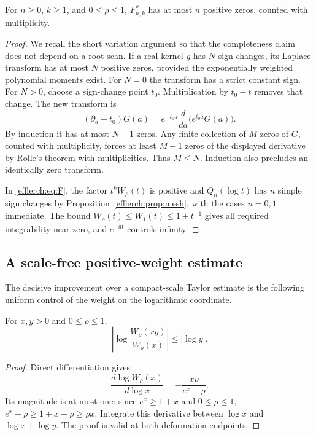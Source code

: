 \begin{lemma}
\label{efflerch:lem:variation}
For $n\geq0$, $k\geq1$, and $0\leq\rho\leq1$,
$F_{n,k}^\rho$ has at most $n$ positive zeros, counted with multiplicity.
\end{lemma}
\begin{proof}
We recall the short variation argument so that the completeness claim
does not depend on a root scan.  If a real kernel $g$ has
$N$ sign changes, its Laplace transform has at most $N$ positive zeros,
provided the exponentially weighted polynomial moments exist.
For $N=0$ the transform has a strict constant sign.  For $N>0$, choose
a sign-change point $t_0$.  Multiplication by $t_0-t$ removes that
change.  The new transform is
\[
 (\partial_a+t_0)G(a)
   =e^{-t_0a}\frac{d}{da}\bigl(e^{t_0a}G(a)\bigr).
\]
By induction it has at most $N-1$ zeros.  Any finite collection of
$M$ zeros of $G$, counted with multiplicity, forces at least $M-1$
zeros of the displayed derivative by Rolle's theorem with multiplicities.
Thus $M\leq N$.  Induction also precludes an identically zero transform.

In \eqref{efflerch:eq:F}, the factor $t^kW_\rho(t)$ is positive and
$Q_n(\log t)$ has $n$ simple sign changes by
Proposition~\ref{efflerch:prop:mesh}, with the cases $n=0,1$ immediate.
The bound $W_\rho(t)\leq W_1(t)\leq1+t^{-1}$ gives all required
integrability near zero, and $e^{-at}$ controls infinity.
\end{proof}

\subsection{A scale-free positive-weight estimate}

The decisive improvement over a compact-scale Taylor estimate is the
following uniform control of the weight on the logarithmic coordinate.

\begin{lemma}
\label{efflerch:lem:weight}
For $x,y>0$ and $0\leq\rho\leq1$,
\begin{equation}\label{efflerch:eq:weight}
 \left|\log\frac{W_\rho(xy)}{W_\rho(x)}\right|\leq|\log y|.
\end{equation}
\end{lemma}
\begin{proof}
Direct differentiation gives
\[
 \frac{d\log W_\rho(x)}{d\log x}
  =-\frac{x\rho}{e^x-\rho}.
\]
Its magnitude is at most one: since $e^x\geq1+x$ and $0\leq\rho\leq1$,
$e^x-\rho\geq1+x-\rho\geq\rho x$.
Integrate this derivative between $\log x$ and $\log x+\log y$.
The proof is valid at both deformation endpoints.
\end{proof}

